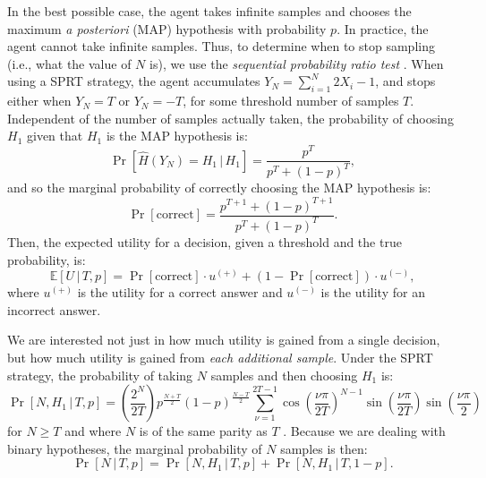 \documentclass[11pt]{article}
\begin{document}
In the best possible case, the agent takes infinite samples and chooses the maximum \emph{a posteriori} (MAP) hypothesis with probability $p$. In practice, the agent cannot take infinite samples. Thus, to determine when to stop sampling (i.e., what the value of $N$ is), we use the \emph{sequential probability ratio test} \cite{wald1947sequential}. When using a SPRT strategy, the agent accumulates $Y_N=\sum_{i=1}^N 2X_i-1$, and stops either when $Y_N=T$ or $Y_N=-T$, for some threshold number of samples $T$. Independent of the number of samples actually taken, the probability of choosing $H_1$ given that $H_1$ is the MAP hypothesis is:
\begin{equation}
\Pr[\hat{H}(Y_N)=H_1\,|\,H_1]=\frac{p^T}{p^T+(1-p)^T},
\label{eq:pr-choose-h1}
\end{equation}
and so the marginal probability of correctly choosing the MAP hypothesis is:
\begin{equation}
\Pr[\mathrm{correct}]=\frac{p^{T+1}+(1-p)^{T+1}}{p^T+(1-p)^T}.
\label{eq:pr-correct}
\end{equation}
Then, the expected utility for a decision, given a threshold and the true probability, is:
\begin{equation}
\mathbb{E}[U\,|\,T,p]=\Pr[\mathrm{correct}]\cdot{}u^{(+)}+(1-\Pr[\mathrm{correct}])\cdot{}u^{(-)},
\label{eq:expected-utility}
\end{equation}
where $u^{(+)}$ is the utility for a correct answer and $u^{(-)}$ is the utility for an incorrect answer.

We are interested not just in how much utility is gained from a single decision, but how much utility is gained from \emph{each additional sample}. Under the SPRT strategy, the probability of taking $N$ samples and then choosing $H_1$ is:
\begin{equation}
\Pr[N,H_1\,|\,T,p]=\left(\frac{2^N}{2T}\right)p^{\frac{N+T}{2}}(1-p)^{\frac{N-T}{2}}\sum_{\nu=1}^{2T-1}\cos\left(\frac{\nu\pi}{2T}\right)^{N-1}\sin\left(\frac{\nu\pi}{2T}\right)\sin\left(\frac{\nu\pi}{2}\right)
\end{equation}
for $N\geq T$ and where $N$ is of the same parity as $T$ \cite[ch.~XIV, eq. 5.7]{Feller:1968ut}. Because we are dealing with binary hypotheses, the marginal probability of $N$ samples is then:
\begin{equation}
\Pr[N\,|\,T,p]=\Pr[N,H_1\,|\,T,p]+\Pr[N,H_1\,|\,T,1-p].
\label{eq:pr-n}
\end{equation}
\end{document}
